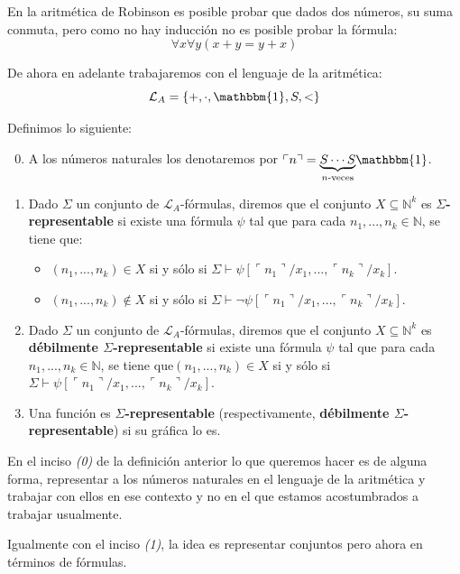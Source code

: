 \documentclass[12pt]{report}
\newcounter{it}
\theoremstyle{largebreak}
\newcommand{\bbm}[1]{\ensuremath{\mathbbm{#1}}}
\newcommand{\winecomma}[1]{\ensuremath{\ulcorner#1\urcorner}}
\begin{document}
    En la aritmética de Robinson es posible probar que dados dos números, su suma conmuta, pero como no hay inducción no es posible probar la fórmula:
    \begin{equation*}
        \forall x\forall y(x+y=y+x)
    \end{equation*}

    De ahora en adelante trabajaremos con el lenguaje de la aritmética:
    \begin{equation*}
        \mathcal{L}_A=\left\{+,\cdot,\bbm{1},S,< \right\}
    \end{equation*}

    \begin{mydef}
        Definimos lo siguiente:
        \begin{enumerate}[label = \textit{(\arabic*)}]
            \setcounter{enumi}{-1}
            \item A los números naturales los denotaremos por $\winecomma{n}=\underset{n\textup{-veces}}{\underbrace{S\cdots S}}\bbm{1}$.
            \item Dado $\Sigma$ un conjunto de $\mathcal{L}_A$-fórmulas, diremos que el conjunto $X\subseteq\mathbb{N}^k$ es \textbf{$\Sigma$-representable} si existe una fórmula $\psi$ tal que para cada $n_1,...,n_k\in\mathbb{N}$, se tiene que:
            \begin{itemize}
                \item $(n_1,...,n_k)\in X$ si y sólo si $\Sigma\vdash\psi\left[\winecomma{n_1}/x_1,...,\winecomma{n_k}/x_k\right]$.
                \item $(n_1,...,n_k)\notin X$ si y sólo si $\Sigma\vdash\neg\psi\left[\winecomma{n_1}/x_1,...,\winecomma{n_k}/x_k\right]$.
            \end{itemize}
            \item Dado $\Sigma$ un conjunto de $\mathcal{L}_A$-fórmulas, diremos que el conjunto $X\subseteq\mathbb{N}^k$ es \textbf{débilmente $\Sigma$-representable} si existe una fórmula $\psi$ tal que para cada $n_1,...,n_k\in\mathbb{N}$, se tiene que$(n_1,...,n_k)\in X$ si y sólo si $\Sigma\vdash\psi\left[\winecomma{n_1}/x_1,...,\winecomma{n_k}/x_k\right]$.
            \item Una función es \textbf{$\Sigma$-representable} (respectivamente, \textbf{débilmente $\Sigma$-representable}) si su gráfica lo es.
        \end{enumerate}
    \end{mydef}

    \begin{obs}
        En el inciso \textit{(0)} de la definición anterior lo que queremos hacer es de alguna forma, representar a los números naturales en el lenguaje de la aritmética y trabajar con ellos en ese contexto y no en el que estamos acostumbrados a trabajar usualmente.

        Igualmente con el inciso \textit{(1)}, la idea es representar conjuntos pero ahora en términos de fórmulas.
    \end{obs}
\end{document}
